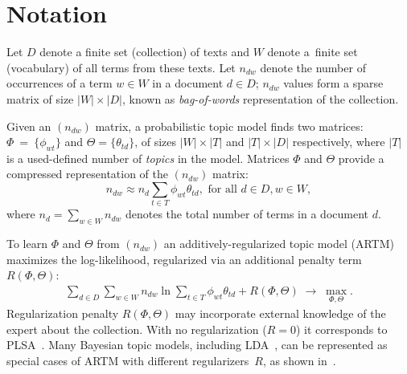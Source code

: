 \documentclass[russian,english]{llncs}
\begin{document}
\section{Notation}
\label{sec:Notation}

Let
$D$ denote a finite set (collection) of texts and
$W$ denote a~finite set (vocabulary) of all terms from these texts.
Let
$n_{dw}$ denote the number of occurrences of a term $w \in W$ in a document $d \in D$;
$n_{dw}$ values form a sparse matrix of size $|W| \times |D|$,
known as \emph{bag-of-words} representation of the collection.

Given an $(n_{dw})$ matrix, a probabilistic topic model finds two matrices:
$\Phi~=~\{\phi_{wt}\}$ and $\Theta = \{\theta_{td}\}$,
of sizes $|W| \times |T|$ and $|T| \times |D|$ respectively,
where $|T|$ is a used-defined number of \emph{topics} in the model.
Matrices $\Phi$ and $\Theta$
provide a compressed representation of the $(n_{dw})$ matrix:
\[
n_{dw} \approx n_d \sum_{t \in T} \phi_{wt} \theta_{td}, \text { for all } d \in D, w \in W,
\]
where $n_d = \sum_{w \in W} n_{dw}$ denotes the total number of terms in a document $d$.

To learn $\Phi$ and $\Theta$ from $(n_{dw})$ an additively-regularized topic model (ARTM) maximizes
the log-likelihood, regularized via an additional penalty term $R(\Phi, \Theta)$:
\begin{gather}
\label{eq:ARTM}
    \sum_{d\in D}\sum_{w\in W} n_{dw} \ln \sum_{t\in T} \phi_{wt} \theta_{td} + R(\Phi, \Theta)
    \;\to\; \max_{\Phi,\Theta}.
\end{gather}
Regularization penalty $R(\Phi, \Theta)$ may incorporate external knowledge
of the expert about the collection.
With no regularization (${R=0}$) it corresponds to PLSA~\cite{hofmann99plsi}.
Many Bayesian topic models, including LDA~\cite{blei03latent}, can be represented
as special cases of ARTM with different regularizers~$R$,
as shown in~\cite{voron14aist,voron15mlj}.
\end{document}

